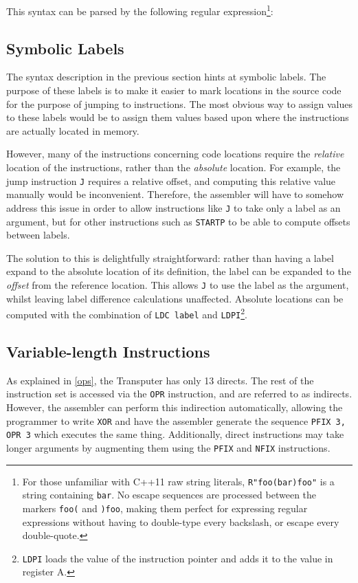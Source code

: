 This syntax can be parsed by the following regular expression\footnote{For those
unfamiliar with C++11 raw string literals, \texttt{R"foo(bar)foo"} is a string
containing \texttt{bar}. No escape sequences are processed between the markers
\texttt{foo(} and \texttt{)foo}, making them perfect for expressing regular
expressions without having to double-type every backslash, or escape every
double-quote.}:


\subsection{Symbolic Labels}

The syntax description in the previous section hints at symbolic labels. The
purpose of these labels is to make it easier to mark locations in the source
code for the purpose of jumping to instructions. The most obvious way to assign
values to these labels would be to assign them values based upon where the
instructions are actually located in memory.

However, many of the instructions concerning code locations require the
\textit{relative} location of the instructions, rather than the
\textit{absolute} location. For example, the jump instruction \texttt{J}
requires a relative offset, and computing this relative value manually would be
inconvenient. Therefore, the assembler will have to somehow address this issue
in order to allow instructions like \texttt{J} to take only a label as an
argument, but for other instructions such as \texttt{STARTP} to be able to
compute offsets between labels.

The solution to this is delightfully straightforward: rather than having a label
expand to the absolute location of its definition, the label can be expanded to
the \textit{offset} from the reference
location\textsuperscript{\cite{supervisor}}. This allows \texttt{J} to use the
label as the argument, whilst leaving label difference calculations unaffected.
Absolute locations can be computed with the combination of \texttt{LDC label}
and \texttt{LDPI}\footnote{\texttt{LDPI} loads the value of the instruction
pointer and adds it to the value in register A.}.

\subsection{Variable-length Instructions}

As explained in \ref{ops}, the Transputer has only 13 \gls{direct}s. The rest of
the instruction set is accessed via the \texttt{OPR} instruction, and are
referred to as \gls{indirect}s. However, the assembler can perform this
indirection automatically, allowing the programmer to write \texttt{XOR} and
have the assembler generate the sequence \texttt{PFIX 3, OPR 3} which executes
the same thing. Additionally, direct instructions may take longer arguments by
augmenting them using the \texttt{PFIX} and \texttt{NFIX} instructions.

